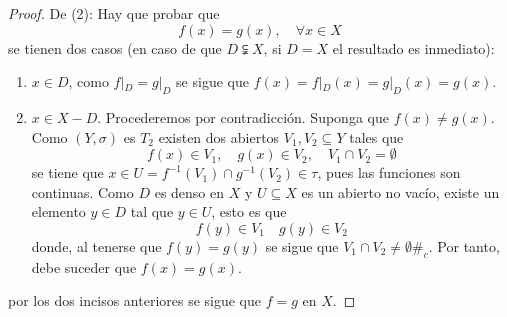 \documentclass[12pt]{report}
\theoremstyle{largebreak}
\newcommand\contradiction{\ensuremath{\#_c}}
\begin{document}
\begin{proof}
        De (2): Hay que probar que
        \begin{equation*}
            f(x)=g(x),\quad\forall x\in X
        \end{equation*}
        se tienen dos casos (en caso de que $D\subsetneqq X$, si $D=X$ el resultado es inmediato):
        \begin{enumerate}
            \item $x\in D$, como $f|_D=g|_D$ se sigue que $f(x)=f|_D(x)=g|_D(x)=g(x)$.
            \item $x\in X-D$. Procederemos por contradicción. Suponga que $f(x)\neq g(x)$. Como $(Y,\sigma)$ es $T_2$ existen dos abiertos $V_1,V_2\subseteq Y$ tales que
            \begin{equation*}
                f(x)\in V_1,\quad g(x)\in V_2,\quad V_1\cap V_2=\emptyset
            \end{equation*}
            se tiene que $x\in U=f^{-1}(V_1)\cap g^{-1}(V_2)\in\tau$, pues las funciones son continuas. Como $D$ es denso en $X$ y $U\subseteq X$ es un abierto no vacío, existe un elemento $y\in D$ tal que $y\in U$, esto es que
            \begin{equation*}
                f(y)\in V_1\quad g(y)\in V_2
            \end{equation*}
            donde, al tenerse que $f(y)=g(y)$ se sigue que $V_1\cap V_2\neq\emptyset$\contradiction. Por tanto, debe suceder que $f(x)=g(x)$.
        \end{enumerate}
        por los dos incisos anteriores se sigue que $f=g$ en $X$.


\end{proof}
\end{document}
